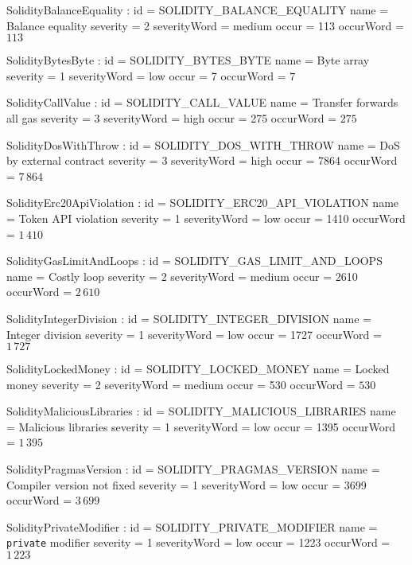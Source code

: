 

\let\letcs\texapiletcs %

\setparameter SolidityBalanceEquality :
id 				= SOLIDITY\_BALANCE\_EQUALITY
name 			= {Balance equality}
severity 		= 2
severityWord 	= medium
occur			= 113
occurWord		= $113$

\setparameter SolidityBytesByte :
id 				= SOLIDITY\_BYTES\_BYTE
name 			= {Byte array}
severity 		= 1
severityWord 	= low
occur			= 7
occurWord		= $7$

\setparameter SolidityCallValue :
id 				= SOLIDITY\_CALL\_VALUE
name 			= {Transfer forwards all gas}
severity 		= 3
severityWord 	= high
occur			= 275
occurWord		= $275$

\setparameter SolidityDosWithThrow :
id 				= SOLIDITY\_DOS\_WITH\_THROW
name 			= {DoS by external contract}
severity 		= 3
severityWord 	= high
occur			= 7864
occurWord		= $7\,864$

\setparameter SolidityErc20ApiViolation :
id 				= SOLIDITY\_ERC20\_API\_VIOLATION
name 			= {Token API violation}
severity 		= 1
severityWord 	= low
occur			= 1410
occurWord		= $1\,410$

\setparameter SolidityGasLimitAndLoops :
id 				= SOLIDITY\_GAS\_LIMIT\_AND\_LOOPS
name 			= {Costly loop}
severity 		= 2
severityWord 	= medium
occur			= 2610
occurWord		= $2\,610$

\setparameter SolidityIntegerDivision :
id 				= SOLIDITY\_INTEGER\_DIVISION
name 			= {Integer division}
severity 		= 1
severityWord 	= low
occur			= 1727
occurWord		= $1\,727$

\setparameter SolidityLockedMoney :
id 				= SOLIDITY\_LOCKED\_MONEY
name 			= {Locked money}
severity 		= 2
severityWord 	= medium
occur			= 530
occurWord		= $530$

\setparameter SolidityMaliciousLibraries :
id 				= SOLIDITY\_MALICIOUS\_LIBRARIES
name 			= {Malicious libraries}
severity 		= 1
severityWord 	= low
occur			= 1395
occurWord		= $1\,395$

\setparameter SolidityPragmasVersion :
id 				= SOLIDITY\_PRAGMAS\_VERSION
name 			= {Compiler version not fixed}
severity 		= 1
severityWord 	= low
occur			= 3699
occurWord		= $3\,699$

\setparameter SolidityPrivateModifier :
id 				= SOLIDITY\_PRIVATE\_MODIFIER
name 			= {\texttt{private} modifier}
severity 		= 1
severityWord 	= low
occur			= 1223
occurWord		= $1\,223$


